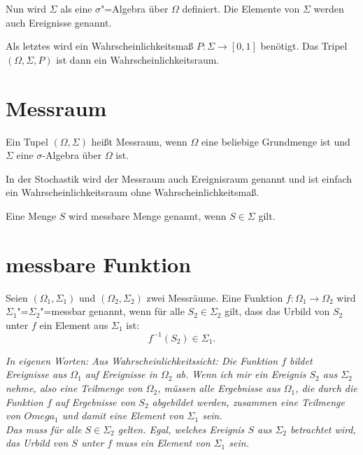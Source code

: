 \documentclass[paper=a4,10pt]{scrartcl}
\begin{document}
\noindent
Nun wird $\Sigma$ als eine $\sigma$"=Algebra über $\Omega$ definiert. Die Elemente von $\Sigma$ werden auch Ereignisse genannt. 

\noindent
Als letztes wird ein Wahrscheinlichkeitsmaß $P: \Sigma \rightarrow [0,1]$ benötigt. Das Tripel $(\Omega, \Sigma, P)$ ist dann ein Wahrscheinlichkeitsraum.
 

\section{Messraum}
Ein Tupel $(\Omega, \Sigma)$ heißt Messraum, wenn $\Omega$ eine beliebige Grundmenge ist und $\Sigma$ eine $\sigma$-Algebra über $\Omega$ ist.

\noindent
In der Stochastik wird der Messraum auch Ereignisraum genannt und ist einfach ein Wahrscheinlichkeitsraum ohne Wahrscheinlichkeitsmaß.

\noindent
Eine Menge $S$ wird messbare Menge genannt, wenn $S \in \Sigma$ gilt.

\section{messbare Funktion}
Seien $(\Omega_1, \Sigma_1)$ und $(\Omega_2, \Sigma_2)$ zwei Messräume. Eine Funktion $f: \Omega_1 \rightarrow \Omega_2$ wird $\Sigma_1$"=$\Sigma_2$"=messbar genannt, wenn für alle $S_2 \in \Sigma_2$ gilt, dass das Urbild von $S_2$ unter $f$ ein Element aus $\Sigma_1$ ist:
\begin{equation}
f^{-1}(S_2) \in \Sigma_1.
\end{equation}

\noindent
\textit{In eigenen Worten: Aus Wahrscheinlichkeitssicht: Die Funktion $f$ bildet Ereignisse aus $\Omega_1$ auf Ereignisse in $\Omega_2$ ab. Wenn ich mir ein Ereignis $S_2$ aus $\Sigma_2$ nehme, also eine Teilmenge von $\Omega_2$, müssen alle Ergebnisse aus $\Omega_1$, die durch die Funktion $f$ auf Ergebnisse von $S_2$ abgebildet werden, zusammen eine Teilmenge von $Omega_1$ und damit eine Element von $\Sigma_1$ sein. \\
Das muss für alle $S \in  \Sigma_2$ gelten. Egal, welches Ereignis $S$ aus $\Sigma_2$ betrachtet wird, das Urbild von $S$ unter $f$ muss ein Element von $\Sigma_1$ sein.}








\end{document}
